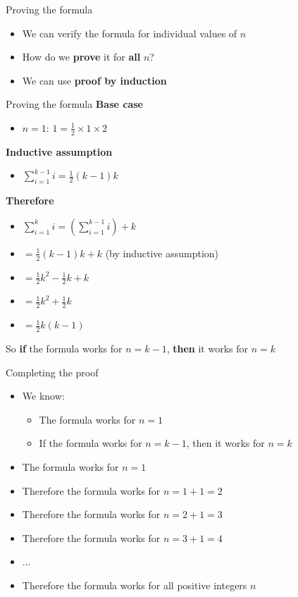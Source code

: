 \begin{frame}{Proving the formula}
\begin{itemize}
	\pause\item We can verify the formula for individual values of $n$
	\pause\item How do we \textbf{prove} it for \textbf{all} $n$?
	\pause\item We can use \textbf{proof by induction}
\end{itemize}
\end{frame}

\begin{frame}{Proving the formula}
\pause\textbf{Base case}
\begin{itemize}
	\pause\item $n=1$: $1 = \frac12 \times 1 \times 2$
\end{itemize}
\pause\textbf{Inductive assumption}
\begin{itemize}
	\pause\item $\sum_{i=1}^{k-1} i = \frac12 (k-1) k$
\end{itemize}
\pause\textbf{Therefore}
\begin{itemize}
	\pause\item $\sum_{i=1}^k i = \left( \sum_{i=1}^{k-1} i \right) + k$
	\pause\item $= \frac12 (k-1) k + k$ (by inductive assumption)
	\pause\item $= \frac12 k^2 - \frac12 k + k$
	\pause\item $= \frac12 k^2 + \frac12 k$
	\pause\item $= \frac12 k (k-1)$
\end{itemize}
\pause So \textbf{if} the formula works for $n=k-1$, \textbf{then} it works for $n=k$
\end{frame}

\begin{frame}{Completing the proof}
\begin{itemize}
	\pause\item We know:
		\begin{itemize}
			\pause\item The formula works for $n=1$
			\pause\item If the formula works for $n=k-1$, then it works for $n=k$
		\end{itemize}
	\pause\item The formula works for $n=1$
	\pause\item Therefore the formula works for $n=1+1=2$
	\pause\item Therefore the formula works for $n=2+1=3$
	\pause\item Therefore the formula works for $n=3+1=4$
	\pause\item ...
	\pause\item Therefore the formula works for all positive integers $n$
\end{itemize}
\end{frame}

